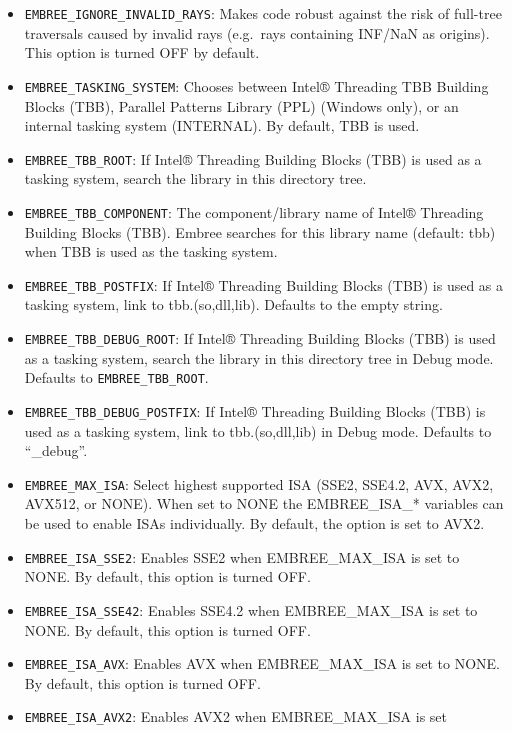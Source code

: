 \begin{itemize}
  intact in callbacks (when the ISA of appropriate width is enabled).
\item
  \texttt{EMBREE\_IGNORE\_INVALID\_RAYS}: Makes code robust against the
  risk of full-tree traversals caused by invalid rays (e.g.~rays
  containing INF/NaN as origins). This option is turned OFF by default.
\item
  \texttt{EMBREE\_TASKING\_SYSTEM}: Chooses between Intel® Threading TBB
  Building Blocks (TBB), Parallel Patterns Library (PPL) (Windows only),
  or an internal tasking system (INTERNAL). By default, TBB is used.
\item
  \texttt{EMBREE\_TBB\_ROOT}: If Intel® Threading Building Blocks (TBB)
  is used as a tasking system, search the library in this directory
  tree.
\item
  \texttt{EMBREE\_TBB\_COMPONENT}: The component/library name of Intel®
  Threading Building Blocks (TBB). Embree searches for this library name
  (default: tbb) when TBB is used as the tasking system.
\item
  \texttt{EMBREE\_TBB\_POSTFIX}: If Intel® Threading Building Blocks
  (TBB) is used as a tasking system, link to tbb.(so,dll,lib). Defaults
  to the empty string.
\item
  \texttt{EMBREE\_TBB\_DEBUG\_ROOT}: If Intel® Threading Building Blocks
  (TBB) is used as a tasking system, search the library in this
  directory tree in Debug mode. Defaults to \texttt{EMBREE\_TBB\_ROOT}.
\item
  \texttt{EMBREE\_TBB\_DEBUG\_POSTFIX}: If Intel® Threading Building
  Blocks (TBB) is used as a tasking system, link to tbb.(so,dll,lib) in
  Debug mode. Defaults to ``\_debug''.
\item
  \texttt{EMBREE\_MAX\_ISA}: Select highest supported ISA (SSE2, SSE4.2,
  AVX, AVX2, AVX512, or NONE). When set to NONE the EMBREE\_ISA\_*
  variables can be used to enable ISAs individually. By default, the
  option is set to AVX2.
\item
  \texttt{EMBREE\_ISA\_SSE2}: Enables SSE2 when EMBREE\_MAX\_ISA is set
  to NONE. By default, this option is turned OFF.
\item
  \texttt{EMBREE\_ISA\_SSE42}: Enables SSE4.2 when EMBREE\_MAX\_ISA is
  set to NONE. By default, this option is turned OFF.
\item
  \texttt{EMBREE\_ISA\_AVX}: Enables AVX when EMBREE\_MAX\_ISA is set to
  NONE. By default, this option is turned OFF.
\item
  \texttt{EMBREE\_ISA\_AVX2}: Enables AVX2 when EMBREE\_MAX\_ISA is set

\end{itemize}

